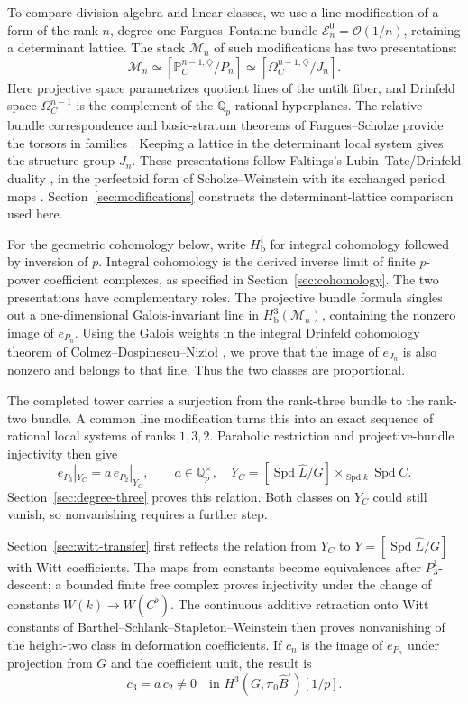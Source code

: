 \documentclass[11pt]{article}
\numberwithin{equation}{section}
\theoremstyle{definition}
\theoremstyle{remark}
\begin{document}
To compare division-algebra and linear classes, we use a line
modification of a form of the rank-\(n\), degree-one Fargues--Fontaine
bundle \(\mathcal E_n^0=\mathcal O(1/n)\), retaining a determinant lattice.
The stack \(\mathcal M_n\) of such modifications has two presentations:
\[
 \mathcal M_n\simeq[\mathbb P_C^{n-1,\diamondsuit}/P_n]
       \simeq[\Omega_C^{n-1,\diamondsuit}/J_n].
\]
Here projective space parametrizes quotient lines of the untilt fiber,
and Drinfeld space \(\Omega_C^{n-1}\) is the complement of the
\(\mathbb Q_p\)-rational hyperplanes. The relative bundle correspondence and
basic-stratum theorems of Fargues--Scholze provide the torsors in
families \cite[Theorem~II.2.19, Corollary~II.2.20, and
Theorems~III.2.4 and~III.4.5]{FS}. Keeping a lattice in the determinant
local system gives the structure group \(J_n\). These presentations
follow Faltings's Lubin--Tate/Drinfeld duality
\cite[Introduction]{Faltings2002}, in the perfectoid form of
Scholze--Weinstein with its exchanged period maps
\cite[Theorem~7.2.3]{SW2013}. Section~\ref{sec:modifications}
constructs the determinant-lattice comparison used here.

For the geometric cohomology below, write \(H^i_{\mathrm b}\) for
integral cohomology followed by inversion of \(p\). Integral cohomology
is the derived inverse limit of finite \(p\)-power coefficient complexes,
as specified in Section~\ref{sec:cohomology}.
The two presentations have complementary roles. The projective bundle
formula singles out a one-dimensional Galois-invariant line in
\(H^3_{\mathrm b}(\mathcal M_n)\), containing the nonzero image of \(e_{P_n}\).
Using the Galois weights in the integral Drinfeld cohomology theorem
of Colmez--Dospinescu--Nizioł \cite[Theorems~1.1 and~5.1]{CDN2021},
we prove that the image of \(e_{J_n}\) is also nonzero and belongs
to that line. Thus the two
classes are proportional.

The completed tower carries a surjection from the rank-three bundle
to the rank-two bundle. A common line modification turns this into
an exact sequence of rational local systems of ranks \(1,3,2\).
Parabolic restriction and projective-bundle injectivity then give
\[
 e_{P_3}|_{Y_C}=a\,e_{P_2}|_{Y_C},\qquad a\in\mathbb Q_p^\times,
 \quad
 Y_C=[\operatorname{Spd}\widehat L/G]\times_{\operatorname{Spd} k}\operatorname{Spd} C.
\]
Section~\ref{sec:degree-three} proves this relation. Both classes on
\(Y_C\) could still vanish, so nonvanishing requires a further step.

Section~\ref{sec:witt-transfer} first reflects the relation from
\(Y_C\) to \(Y=[\operatorname{Spd}\widehat L/G]\) with Witt coefficients. The
maps from constants become equivalences after \(P_3^1\)-descent;
a bounded finite free complex proves injectivity under the change
of constants \(W(k)\to W(C^\flat)\). The continuous additive
retraction onto Witt constants of Barthel--Schlank--Stapleton--Weinstein
\cite[Proposition~2.5.1 and Corollary~2.5.9]{BSSW2025} then proves
nonvanishing of the height-two class in deformation coefficients.
If \(c_n\) is the image of \(e_{P_n}\) under projection from \(G\)
and the coefficient unit, the result is
\[
 c_3=a\,c_2\ne0
 \quad\text{in }H^3(G,\pi_0\widehat B^\square)[1/p].
\]
\end{document}
